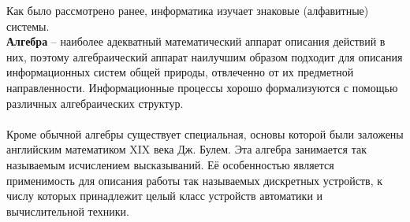 Как было рассмотрено ранее, информатика изучает знаковые (алфавитные) системы.\\ \textbf{Алгебра} -- наиболее адекватный математический аппарат описания действий в них, поэтому алгебраический аппарат наилучшим образом подходит для описания информационных систем общей природы, отвлеченно от их предметной направленности. Информационные процессы хорошо формализуются с помощью различных алгебраических структур. \\
\\Кроме обычной алгебры существует специальная, основы которой были заложены английским математиком XIX века Дж. Булем. Эта алгебра занимается так называемым исчислением высказываний. Её особенностью является применимость для описания работы так называемых дискретных устройств, к числу которых принадлежит целый класс устройств автоматики и вычислительной техники.
